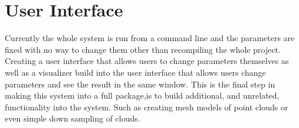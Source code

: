 \section{User Interface}
	Currently the whole system is run from a command line and the parameters are fixed with no way to change them other than recompiling the whole project. Creating a user interface that allows users to change parameters themselves as well as a visualizer build into the user interface that allows users change parameters and see the result in the same window. This is the final step in making this system into a full package,is to build additional, and unrelated, functionality into the system. Such as creating mesh models of point clouds or even simple down sampling of clouds. 
	
	
	